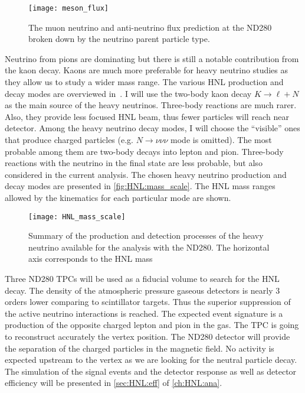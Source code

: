 \documentclass[../main.tex]{subfiles}
\begin{document}
\begin{figure}[!ht]
    \centering
    \texttt{[image: meson\_flux]}
    \caption{The muon neutrino and anti-neutrino flux prediction at the ND280 broken down by the neutrino parent particle type.}
    \label{fig:HNL:meson_flux}
\end{figure}

Neutrino from pions are dominating but there is still a notable contribution from the kaon decay. Kaons are much more preferable for heavy neutrino studies as they allow us to study a wider mass range. The various HNL production and decay modes are overviewed in~\cite{Gorbunov2007}. I will use the two-body kaon decay $K\to\ell+N$ as the main source of the heavy neutrinos. Three-body reactions are much rarer. Also, they provide less focused HNL beam, thus fewer particles will reach near detector. Among the heavy neutrino decay modes, I will choose the ``visible'' ones that produce charged particles (e.g. $N\to\nu\nu\nu$ mode is omitted). The most probable among them are two-body decays into lepton and pion. Three-body reactions with the neutrino in the final state are less probable, but also considered in the current analysis. The chosen heavy neutrino production and decay modes are presented in \autoref{fig:HNL:mass_scale}. The HNL mass ranges allowed by the kinematics for each particular mode are shown.

\begin{figure}[!ht]
    \centering
    \texttt{[image: HNL\_mass\_scale]}
    \caption{Summary of the production and detection processes of the heavy neutrino available for the analysis with the ND280. The horizontal axis corresponds to the HNL mass}
    \label{fig:HNL:mass_scale}
\end{figure}

Three ND280 TPCs will be used as a fiducial volume to search for the HNL decay. The density of the atmospheric pressure gaseous detectors is nearly 3 orders lower comparing to scintillator targets. Thus the superior suppression of the active neutrino interactions is reached. The expected event signature is a production of the opposite charged lepton and pion in the gas. The TPC is going to reconstruct accurately the vertex position. The ND280 detector will provide the separation of the charged particles in the magnetic field. No activity is expected upstream to the vertex as we are looking for the neutral particle decay. The simulation of the signal events and the detector response as well as detector efficiency will be presented in \autoref{sec:HNL:eff} of \autoref{ch:HNL:ana}.
\end{document}
